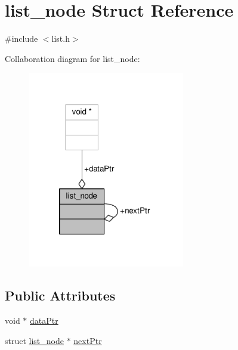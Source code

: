 \hypertarget{structlist__node}{\section{list\-\_\-node Struct Reference}
\label{structlist__node}
}


{\ttfamily \#include $<$list.\-h$>$}



Collaboration diagram for list\-\_\-node\-:
\nopagebreak
\begin{figure}[H]
\begin{center}
\leavevmode
\includegraphics[width=194pt]{structlist__node__coll__graph}
\end{center}
\end{figure}
\subsection*{Public Attributes}
\begin{DoxyCompactItemize}
\item 
void $\ast$ \hyperlink{structlist__node_a0a922cb31b0056d0768705b4e3520b9b}{data\-Ptr}
\item 
struct \hyperlink{structlist__node}{list\-\_\-node} $\ast$ \hyperlink{structlist__node_a313d757129d4df20359f56a05b94175a}{next\-Ptr}
\end{DoxyCompactItemize}


